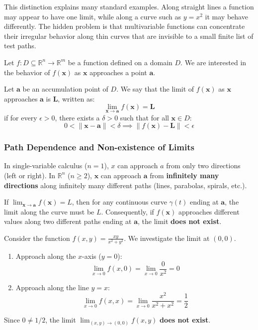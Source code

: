 This distinction explains many standard examples. Along straight lines a function may appear to have one limit, while along a curve such as $y=x^2$ it may behave differently. The hidden problem is that multivariable functions can concentrate their irregular behavior along thin curves that are invisible to a small finite list of test paths.

Let $f: D \subseteq \mathbb{R}^n \to \mathbb{R}^m$ be a function defined on a domain $D$. We are interested in the behavior of $f(\mathbf{x})$ as $\mathbf{x}$ approaches a point $\mathbf{a}$.

\begin{definition}[Limit]
Let $\mathbf{a}$ be an accumulation point of $D$. We say that the limit of $f(\mathbf{x})$ as $\mathbf{x}$ approaches $\mathbf{a}$ is $\mathbf{L}$, written as:
\[ \lim_{\mathbf{x} \to \mathbf{a}} f(\mathbf{x}) = \mathbf{L} \]
if for every $\epsilon > 0$, there exists a $\delta > 0$ such that for all $\mathbf{x} \in D$:
\[ 0 < \|\mathbf{x} - \mathbf{a}\| < \delta \implies \|f(\mathbf{x}) - \mathbf{L}\| < \epsilon \]
\end{definition}

\subsubsection{Path Dependence and Non-existence of Limits}

In single-variable calculus ($n=1$), $x$ can approach $a$ from only two directions (left or right). In $\mathbb{R}^n$ ($n \ge 2$), $\mathbf{x}$ can approach $\mathbf{a}$ from \textbf{infinitely many directions} along infinitely many different paths (lines, parabolas, spirals, etc.).

\begin{theorem}
If $\lim_{\mathbf{x} \to \mathbf{a}} f(\mathbf{x}) = L$, then for any continuous curve $\gamma(t)$ ending at $\mathbf{a}$, the limit along the curve must be $L$.
Consequently, if $f(\mathbf{x})$ approaches different values along two different paths ending at $\mathbf{a}$, the limit \textbf{does not exist}.
\end{theorem}



\begin{example}
Consider the function $f(x, y) = \frac{xy}{x^2 + y^2}$. We investigate the limit at $(0,0)$.
\begin{enumerate}
    \item Approach along the $x$-axis ($y=0$):
    \[ \lim_{x \to 0} f(x, 0) = \lim_{x \to 0} \frac{0}{x^2} = 0 \]
    \item Approach along the line $y=x$:
    \[ \lim_{x \to 0} f(x, x) = \lim_{x \to 0} \frac{x^2}{x^2 + x^2} = \frac{1}{2} \]
\end{enumerate}
Since $0 \ne 1/2$, the limit $\lim_{(x,y) \to (0,0)} f(x,y)$ \textbf{does not exist}.
\end{example}


